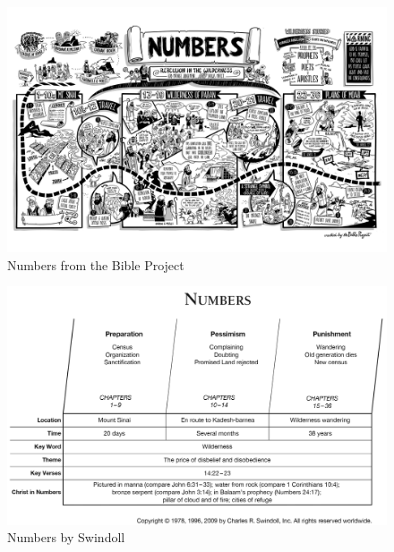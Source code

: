 \newpage
\begin{figure}
\begin{center}
\includegraphics[scale=0.5, angle=90]{04OT-Numbers/References/BibleProject-Numbers.jpg}
\caption[Numbers from the Bible Project]{Numbers from the Bible Project}
\label{fig:Numbers from the Bible Project}
\end{center}
\end{figure}

\newpage
\begin{figure}
\begin{center}
\includegraphics[scale=0.3, angle=90]{04OT-Numbers/References/Swindoll-Numbers.png}
\caption[Numbers by Swindoll]{Numbers by Swindoll}
\label{fig:Numbers by Swindoll}
\end{center}
\end{figure}

